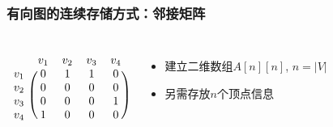\begin{frame}[fragile]
  \frametitle{有向图的连续存储方式：邻接矩阵}
  \begin{columns}[T]
    \[
      \begin{blockarray}{ccccc}
        & v_1 & v_2 & v_3 & v_4 \\
        \begin{block}{c (c c c c)}
          v_1 & 0 & 1 & 1 & 0 \\
          v_2 & 0 & 0 & 0 & 0 \\
          v_3 & 0 & 0 & 0 & 1 \\
          v_4 & 1 & 0 & 0 & 0 \\
        \end{block}
      \end{blockarray}
    \]
    
    \begin{itemize}
    \item 建立二维数组$A[n][n]$, $n=|V|$
    \item 另需存放$n$个顶点信息
    \end{itemize}
  \end{columns}
\end{frame}

